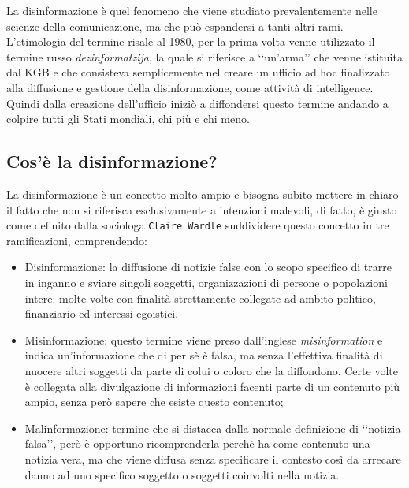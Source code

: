\documentclass{article}
\begin{document}
\begin{justify}
    La disinformazione è quel fenomeno che viene studiato prevalentemente nelle scienze della comunicazione, ma che può espandersi a tanti altri rami.
    L'etimologia del termine risale al 1980, per la prima volta venne utilizzato il termine russo \textit{dezinformatzija}, la quale si riferisce a ‘‘un'arma’’ che venne istituita dal KGB e che consisteva semplicemente nel creare un ufficio ad hoc finalizzato alla diffusione e gestione della disinformazione, come attività di intelligence.\citep{DisWiki}\\
    Quindi dalla creazione dell'ufficio iniziò a diffondersi questo termine andando a colpire tutti gli Stati mondiali, chi più e chi meno.
\end{justify}

\centering\subsection{Cos'è la disinformazione?}

\begin{justify}
    La disinformazione è un concetto molto ampio e bisogna subito mettere in chiaro il fatto che non si riferisca esclusivamente a intenzioni malevoli, di fatto, è giusto come definito dalla sociologa \texttt{Claire Wardle} suddividere questo concetto in tre ramificazioni, comprendendo:
\begin{itemize}
    \item Disinformazione: la diffusione di notizie false con lo scopo specifico di trarre in inganno e sviare singoli soggetti, organizzazioni di persone o popolazioni intere: molte volte con finalità strettamente collegate ad ambito politico, finanziario ed interessi egoistici.
    \item Misinformazione: questo termine viene preso dall'inglese \textit{misinformation} e indica un'informazione che di per sè è falsa, ma senza l'effettiva finalità di nuocere altri soggetti da parte di colui o coloro che la diffondono. Certe volte è collegata alla divulgazione di informazioni facenti parte di un contenuto più ampio, senza però sapere che esiste questo contenuto;
    \item Malinformazione: termine che si distacca dalla normale definizione di ‘‘notizia falsa’’, però è opportuno ricomprenderla perchè ha come contenuto una notizia vera, ma che viene diffusa senza specificare il contesto così da arrecare danno ad uno specifico soggetto o soggetti coinvolti nella notizia. \citep{wardle2018information}
\end{itemize}
\end{justify}
\end{document}
